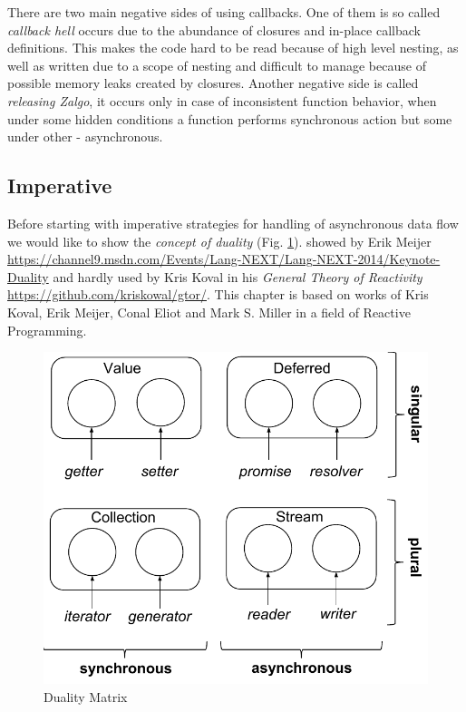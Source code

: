 There are two main negative sides of using callbacks. One of them is so called \textit{callback hell} occurs due to the abundance of closures and in-place callback definitions. This makes the code hard to be read because of high level nesting, as well as written due to a scope of nesting and difficult to manage because of possible memory leaks created by closures. Another negative side is called \textit{releasing Zalgo}\cite{zalgo}, it occurs only in case of inconsistent function behavior, when under some hidden conditions a function performs synchronous action but some under other - asynchronous.

\subsection{Imperative}
Before starting with imperative strategies for handling of asynchronous data flow we would like to show the \textit{concept of duality} (Fig. \ref{fig:dualityMatrix}). showed by Erik Meijer \url{https://channel9.msdn.com/Events/Lang-NEXT/Lang-NEXT-2014/Keynote-Duality} and hardly used by Kris Koval in his \textit{General Theory of Reactivity} \url{https://github.com/kriskowal/gtor/}. This chapter is based on works of Kris Koval, Erik Meijer, Conal Eliot and Mark S. Miller in a field of Reactive Programming.

\begin{figure}[ht]
	\label{fig:dualityMatrix}
	\centering
	\includegraphics[scale = 0.5]{grafiken/dualityMatrix}
	\caption{Duality Matrix \cite{gtor}}
\end{figure}

